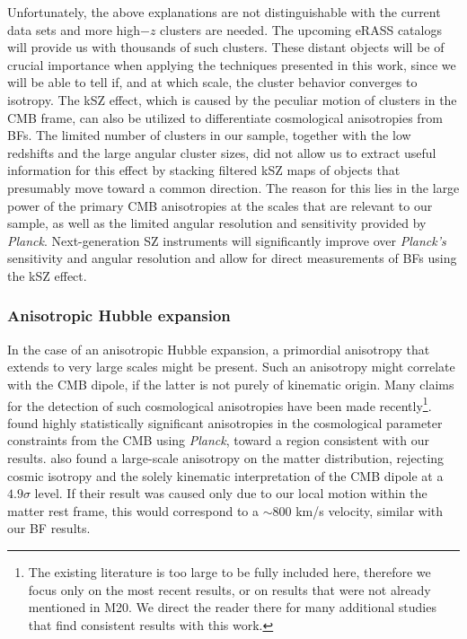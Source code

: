 \documentclass{aa}   %
\begin{document}
Unfortunately, the above explanations are not distinguishable with the current data sets and more high$-z$ clusters are needed. The upcoming eRASS catalogs will provide us with thousands of such clusters. These distant objects will be of crucial importance when applying the techniques presented in this work, since we will be able to tell if, and at which scale, the cluster behavior converges to isotropy. The kSZ effect, which is caused by the peculiar motion of clusters in the CMB frame, can also be utilized to differentiate cosmological anisotropies from BFs. The limited number of clusters in our sample, together with the low redshifts and the large angular cluster sizes, did not allow us to extract useful information for this effect by stacking filtered kSZ maps of objects that presumably move toward a common direction. The reason for this lies in the large power of the primary CMB anisotropies at the scales that are relevant to our sample, as well as the limited angular resolution and sensitivity provided by \textit{Planck}. Next-generation SZ instruments will significantly improve over \textit{Planck's} sensitivity and angular resolution and allow for direct measurements of BFs using the kSZ effect. 

\subsubsection{Anisotropic Hubble expansion}

In the case of an anisotropic Hubble expansion, a primordial anisotropy that extends to very large scales might be present. Such an anisotropy might correlate with the CMB dipole, if the latter is not purely of kinematic origin. Many claims for the detection of such cosmological anisotropies have been made recently\footnote{The existing literature is too large to be fully included here, therefore we focus only on the most recent results, or on results that were not already mentioned in M20. We direct the reader there for many additional studies that find consistent results with this work.}. \citet{fosalba} found highly statistically significant anisotropies in the cosmological parameter constraints from the CMB using \textit{Planck}, toward a region consistent with our results. \citet{secrest} also found a large-scale anisotropy on the matter distribution, rejecting cosmic isotropy and the solely kinematic interpretation of the CMB dipole at a $4.9\sigma$ level. If their result was caused only due to our local motion within the matter rest frame, this would correspond to a $\sim 800$ km/s velocity, similar with our BF results.
\end{document}
